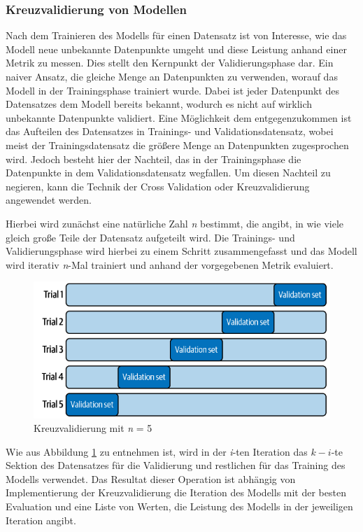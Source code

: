 \subsubsection{Kreuzvalidierung von Modellen}
Nach dem Trainieren des Modells für einen Datensatz ist von Interesse, wie das Modell neue unbekannte Datenpunkte umgeht und diese Leistung anhand einer Metrik zu messen.
Dies stellt den Kernpunkt der Validierungsphase dar. Ein naiver Ansatz, die gleiche Menge an Datenpunkten zu verwenden, worauf das Modell in der Trainingsphase trainiert wurde.
Dabei ist jeder Datenpunkt des Datensatzes dem Modell bereits bekannt, wodurch es nicht auf wirklich unbekannte Datenpunkte validiert.
Eine Möglichkeit dem entgegenzukommen ist das Aufteilen des Datensatzes in Trainings- und Validationsdatensatz, wobei meist der Trainingsdatensatz die größere Menge an Datenpunkten zugesprochen wird.
Jedoch besteht hier der Nachteil, das in der Trainingsphase die Datenpunkte in dem Validationsdatensatz wegfallen.
Um diesen Nachteil zu negieren, kann die Technik der Cross Validation oder Kreuzvalidierung angewendet werden.

Hierbei wird zunächst eine natürliche Zahl \textit{n} bestimmt, die angibt, in wie viele gleich große Teile der Datensatz aufgeteilt wird.
Die Trainings- und Validierungsphase wird hierbei zu einem Schritt zusammengefasst und das Modell wird iterativ \textit{n}-Mal trainiert und anhand der vorgegebenen Metrik evaluiert.

\begin{figure}[h]
    \centering
    \includegraphics[scale=0.5]{figures/cross_validation}
    \caption{Kreuzvalidierung mit \textit{n} = 5}
    \label{fig:cross_validation}
\end{figure}
Wie aus Abbildung \ref{fig:cross_validation} zu entnehmen ist, wird in der \textit{i}-ten Iteration das $k-i$-te Sektion des Datensatzes für die Validierung und restlichen
für das Training des Modells verwendet. Das Resultat dieser Operation ist abhängig von Implementierung der Kreuzvalidierung die Iteration des Modells mit der besten Evaluation und eine Liste von Werten, die Leistung des Modells in der jeweiligen Iteration angibt.


